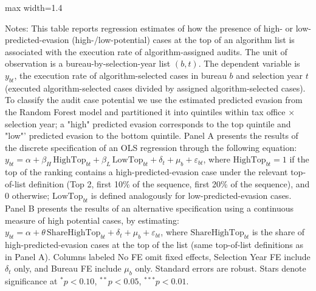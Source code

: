 \documentclass{article}
\newcommand{\OutPath}{Output/}%
\newcommand{\OutPath}{../Output/}%
\begin{document}
\begin{landscape}


\begin{table}[H]\centering
\begin{adjustbox}{max width=1.4\textwidth}
\begin{threeparttable}
\caption{Execution of algorithm-assigned audits and high predicted evasion cases at the top of the list [Full audits]}
\label{tab:exec_rate_full_panels}

\footnotesize


\begin{tablenotes}[flushleft]
\footnotesize
\item Notes: This table reports regression estimates of how the presence of high- or low-predicted-evasion (high-/low-potential) cases at the top of an algorithm list is associated with the execution rate of algorithm-assigned audits. The unit of observation is a bureau-by-selection-year list $(b,t)$. The dependent variable is $y_{bt}$, the execution rate of algorithm-selected cases in bureau $b$ and selection year $t$ (executed algorithm-selected cases divided by assigned algorithm-selected cases). To classify the audit case potential we use the  estimated  predicted evasion from the Random Forest model and partitioned it into quintiles within tax office $\times$ selection year; a  "high" predicted evasion corresponds to the top quintile and "low"' predicted evasion to the bottom quintile. Panel A presents the results of the  discrete specification of an OLS regression through the following equation:  $y_{bt}=\alpha+\beta_H\,\text{HighTop}_{bt}+\beta_L\,\text{LowTop}_{bt}+\delta_t+\mu_b+\varepsilon_{bt}$, where $\text{HighTop}_{bt}=1$ if the top of the ranking contains a high-predicted-evasion case under the relevant top-of-list definition (Top 2, first 10\% of the sequence, first 20\% of the sequence), and 0 otherwise; $\text{LowTop}_{bt}$ is defined analogously for low-predicted-evasion cases. Panel B presents the results of an alternative specification using a continuous measure of high potential cases, by estimating: $y_{bt}=\alpha+\theta\,\text{ShareHighTop}_{bt}+\delta_t+\mu_b+\varepsilon_{bt}$, where $\text{ShareHighTop}_{bt}$ is the share of high-predicted-evasion cases at the top of the list (same top-of-list definitions as in Panel A). Columns labeled No FE omit fixed effects, Selection Year FE include $\delta_t$ only, and Bureau FE include $\mu_b$ only. Standard errors are robust. Stars denote significance at $^{*}p<0.10$, $^{**}p<0.05$, $^{***}p<0.01$.
\end{tablenotes}
\end{threeparttable}
\end{adjustbox}
\end{table}


\end{landscape}
\end{document}
